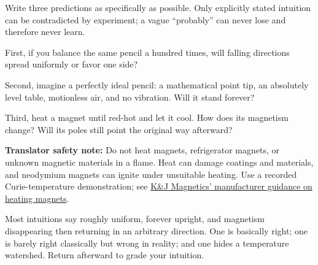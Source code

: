 \begin{mainline}
Write three predictions as specifically as possible. Only explicitly stated intuition can be contradicted by experiment; a vague ``probably'' can never lose and therefore never learn.

First, if you balance the same pencil a hundred times, will falling directions spread uniformly or favor one side?

Second, imagine a perfectly ideal pencil: a mathematical point tip, an absolutely level table, motionless air, and no vibration. Will it stand forever?

Third, heat a magnet until red-hot and let it cool. How does its magnetism change? Will its poles still point the original way afterward?

\textbf{Translator safety note:} Do not heat magnets, refrigerator magnets, or unknown magnetic materials in a flame. Heat can damage coatings and materials, and neodymium magnets can ignite under unsuitable heating. Use a recorded Curie-temperature demonstration; see \href{https://www.kjmagnetics.com/faq.asp}{K\&J Magnetics' manufacturer guidance on heating magnets}.

Most intuitions say roughly uniform, forever upright, and magnetism disappearing then returning in an arbitrary direction. One is basically right; one is barely right classically but wrong in reality; and one hides a temperature watershed. Return afterward to grade your intuition.
\end{mainline}


